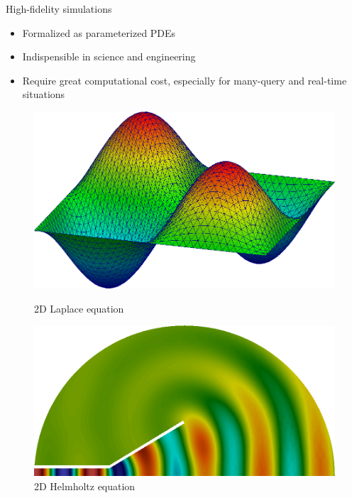 \documentclass[10pt]{beamer}
\begin{document}
\begin{frame}{High-fidelity simulations}

\begin{itemize}
\item Formalized as parameterized PDEs
\item Indispensible in science and engineering
\item Require great computational cost, especially for many-query and real-time situations
\end{itemize}

\begin{figure}
\centering
  \begin{minipage}[t]{0.32\textwidth}
    \includegraphics[width=\textwidth]{figures/Lapl2D_4.png}
    \footnotemark[1]
    \caption{2D Laplace equation}
  \end{minipage}
  \begin{minipage}[t]{0.32\textwidth}
    \includegraphics[width=\textwidth]{figures/AcousticHorn.png}
    \footnotemark[1]
    \caption{2D Helmholtz equation}
  \end{minipage}
  \begin{minipage}[t]{0.32\textwidth}

\end{minipage}
\end{figure}
\end{frame}
\end{document}
